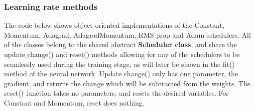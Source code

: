\documentclass{beamer}
\begin{document}
\begin{frame}
\frametitle{Learning rate methods}

The code below shows object oriented implementations of the Constant,
Momentum, Adagrad, AdagradMomentum, RMS prop and Adam schedulers. All
of the classes belong to the shared abstract \textbf{Scheduler class}, and
share the update$\_$change() and reset() methods allowing for any of the
schedulers to be seamlessly used during the training stage, as will
later be shown in the fit() method of the neural
network. Update$\_$change() only has one parameter, the gradient, and returns the change which will be subtracted
from the weights. The reset() function takes no parameters, and resets
the desired variables. For Constant and Momentum, reset does nothing.





















































































\end{frame}
\end{document}
